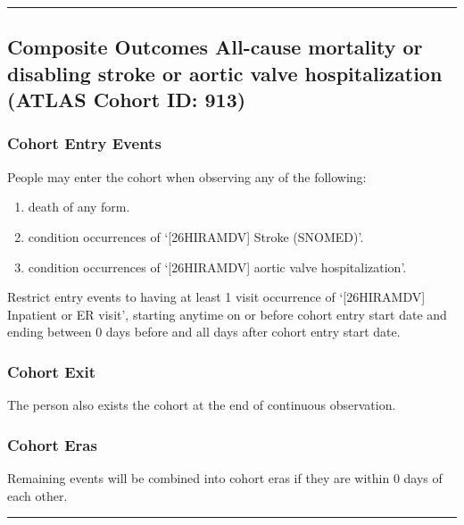 \documentclass[
  12pt,
]{article}
\begin{document}
\begin{center}\rule{0.5\linewidth}{0.5pt}\end{center}

\subsection{Composite Outcomes All-cause mortality or disabling stroke
or aortic valve hospitalization (ATLAS Cohort ID:
913)}\label{composite-outcomes-all-cause-mortality-or-disabling-stroke-or-aortic-valve-hospitalization-atlas-cohort-id-913}

\subsubsection{Cohort Entry Events}\label{cohort-entry-events-13}

People may enter the cohort when observing any of the following:

\begin{enumerate}
\def\labelenumi{\arabic{enumi}.}
\item
  death of any form.
\item
  condition occurrences of `{[}26HIRAMDV{]} Stroke (SNOMED)'.
\item
  condition occurrences of `{[}26HIRAMDV{]} aortic valve
  hospitalization'.
\end{enumerate}

Restrict entry events to having at least 1 visit occurrence of
`{[}26HIRAMDV{]} Inpatient or ER visit', starting anytime on or before
cohort entry start date and ending between 0 days before and all days
after cohort entry start date.

\subsubsection{Cohort Exit}\label{cohort-exit-13}

The person also exists the cohort at the end of continuous observation.

\subsubsection{Cohort Eras}\label{cohort-eras-13}

Remaining events will be combined into cohort eras if they are within 0
days of each other.

\begin{center}\rule{0.5\linewidth}{0.5pt}\end{center}
\end{document}
